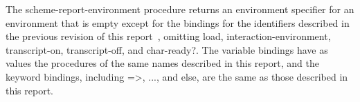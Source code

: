 \begin{entry}{%
}

  The {\cf scheme-report-environment} procedure returns
an environment specifier for an environment that is empty except for
the bindings for the identifiers described in the previous
revision of this report~\cite{R5RS}, omitting {\cf load}, {\cf
  interaction-environment}, {\cf
  transcript-on}, {\cf transcript-off}, and {\cf char-ready?}.  The
variable bindings have as values the procedures of the same names described in
this report, and the keyword bindings, including
{\cf =>}, {\cf ...}, and {\cf else}, are the same as those described
in this report.
\end{entry}


